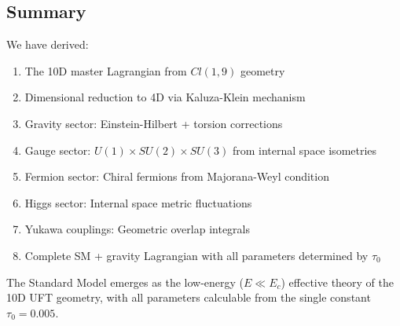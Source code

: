 \subsection{Summary}

We have derived:
\begin{enumerate}
    \item The 10D master Lagrangian from $Cl(1,9)$ geometry
    \item Dimensional reduction to 4D via Kaluza-Klein mechanism
    \item Gravity sector: Einstein-Hilbert + torsion corrections
    \item Gauge sector: $U(1) \times SU(2) \times SU(3)$ from internal space isometries
    \item Fermion sector: Chiral fermions from Majorana-Weyl condition
    \item Higgs sector: Internal space metric fluctuations
    \item Yukawa couplings: Geometric overlap integrals
    \item Complete SM + gravity Lagrangian with all parameters determined by $\tau_0$
\end{enumerate}

The Standard Model emerges as the low-energy ($E \ll E_c$) effective theory of the 10D UFT geometry, with all parameters calculable from the single constant $\tau_0 = 0.005$.

